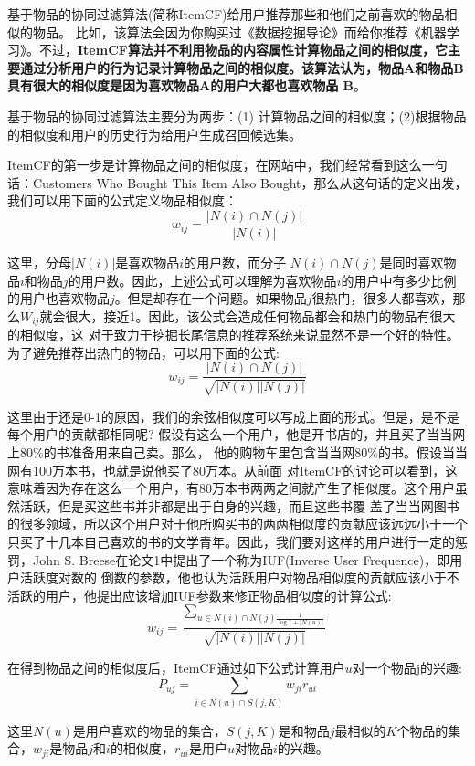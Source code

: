\documentclass[12pt]{article}
\begin{document}
基于物品的协同过滤算法(简称ItemCF)给用户推荐那些和他们之前喜欢的物品相似的物品。 比如，该算法会因为你购买过《数据挖掘导论》而给你推荐《机器学习》。不过，\textbf{ItemCF算法并不利用物品的内容属性计算物品之间的相似度，它主要通过分析用户的行为记录计算物品之间的相似度。该算法认为，物品A和物品B具有很大的相似度是因为喜欢物品A的用户大都也喜欢物品 B}。

基于物品的协同过滤算法主要分为两步：(1) 计算物品之间的相似度；(2)根据物品的相似度和用户的历史行为给用户生成召回候选集。

ItemCF的第一步是计算物品之间的相似度，在网站中，我们经常看到这么一句话：Customers Who Bought This Item Also Bought，那么从这句话的定义出发，我们可以用下面的公式定义物品相似度：
$$
w_{ij} = \frac{|N(i) \cap N(j)|}{|N(i)|}
$$

这里，分母$|N(i)|$是喜欢物品$i$的用户数，而分子 $N(i)\cap N(j) $是同时喜欢物品$i$和物品$j$的用户数。因此，上述公式可以理解为喜欢物品$i$的用户中有多少比例的用户也喜欢物品$j$。但是却存在一个问题。如果物品$j$很热门，很多人都喜欢，那么$W_{ij}$就会很大，接近1。因此，该公式会造成任何物品都会和热门的物品有很大的相似度，这 对于致力于挖掘长尾信息的推荐系统来说显然不是一个好的特性。为了避免推荐出热门的物品，可以用下面的公式:
$$
w_{ij} = \frac{|N(i) \cap N(j)|}{\sqrt{|N(i)||N(j)|}}
$$

这里由于还是0-1的原因，我们的余弦相似度可以写成上面的形式。但是，是不是每个用户的贡献都相同呢? 假设有这么一个用户，他是开书店的，并且买了当当网上80\%的书准备用来自己卖。那么， 他的购物车里包含当当网80\%的书。假设当当网有100万本书，也就是说他买了80万本。从前面 对ItemCF的讨论可以看到，这意味着因为存在这么一个用户，有80万本书两两之间就产生了相似度。这个用户虽然活跃，但是买这些书并非都是出于自身的兴趣，而且这些书覆 盖了当当网图书的很多领域，所以这个用户对于他所购买书的两两相似度的贡献应该远远小于一个只买了十几本自己喜欢的书的文学青年。因此，我们要对这样的用户进行一定的惩罚，John S. Breese在论文1中提出了一个称为IUF(Inverse User Frequence)，即用户活跃度对数的 倒数的参数，他也认为活跃用户对物品相似度的贡献应该小于不活跃的用户，他提出应该增加IUF参数来修正物品相似度的计算公式:
$$
w_{ij} = \frac{\sum_{u \in N(i) \cap N(j)\frac{1}{\log 1 + |N(u)|}}}{\sqrt{|N(i)||N(j)|}}
$$

在得到物品之间的相似度后，ItemCF通过如下公式计算用户$u$对一个物品j的兴趣:
$$
P_{uj} = \sum_{i \in N(u) \cap S(j,K)}w_{ji}r_{ui}
$$

这里$N(u)$是用户喜欢的物品的集合，$S(j,K)$是和物品$j$最相似的$K$个物品的集合，$w_{ji}$是物品$j$和$i$的相似度，$r_{ui}$是用户$u$对物品$i$的兴趣。
\end{document}
